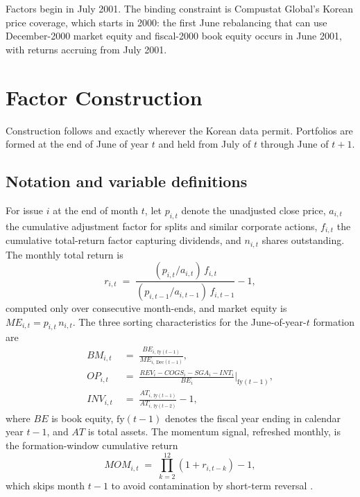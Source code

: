 \documentclass[11pt]{article}
\begin{document}
Factors begin in July 2001. The binding constraint is Compustat Global's Korean price coverage, which starts in 2000: the first June rebalancing that can use December-2000 market equity and fiscal-2000 book equity occurs in June 2001, with returns accruing from July 2001.

\section{Factor Construction}\label{sec:construction}

Construction follows \citet{fama1993} and \citet{fama2015} exactly wherever the Korean data permit. Portfolios are formed at the end of June of year $t$ and held from July of $t$ through June of $t+1$.

\subsection{Notation and variable definitions}

For issue $i$ at the end of month $t$, let $p_{i,t}$ denote the unadjusted close price, $a_{i,t}$ the cumulative adjustment factor for splits and similar corporate actions, $f_{i,t}$ the cumulative total-return factor capturing dividends, and $n_{i,t}$ shares outstanding. The monthly total return is
\begin{equation}
r_{i,t} \;=\; \frac{(p_{i,t}/a_{i,t})\, f_{i,t}}{(p_{i,t-1}/a_{i,t-1})\, f_{i,t-1}} - 1,
\label{eq:ret}
\end{equation}
computed only over consecutive month-ends, and market equity is $ME_{i,t} = p_{i,t}\, n_{i,t}$. The three sorting characteristics for the June-of-year-$t$ formation are
\begin{align}
BM_{i,t} &\;=\; \frac{BE_{i,\,\mathrm{fy}(t-1)}}{ME_{i,\,\mathrm{Dec}(t-1)}}, \label{eq:bm}\\[2pt]
OP_{i,t} &\;=\; \frac{REV_{i} - COGS_{i} - SGA_{i} - INT_{i}}{BE_{i}}\bigg|_{\mathrm{fy}(t-1)}, \label{eq:op}\\[2pt]
INV_{i,t} &\;=\; \frac{AT_{i,\,\mathrm{fy}(t-1)}}{AT_{i,\,\mathrm{fy}(t-2)}} - 1, \label{eq:inv}
\end{align}
where $BE$ is book equity, $\mathrm{fy}(t-1)$ denotes the fiscal year ending in calendar year $t-1$, and $AT$ is total assets. The momentum signal, refreshed monthly, is the formation-window cumulative return
\begin{equation}
MOM_{i,t} \;=\; \prod_{k=2}^{12} (1 + r_{i,t-k}) - 1,
\label{eq:mom}
\end{equation}
which skips month $t-1$ to avoid contamination by short-term reversal \citep{jegadeesh1993}.
\end{document}
